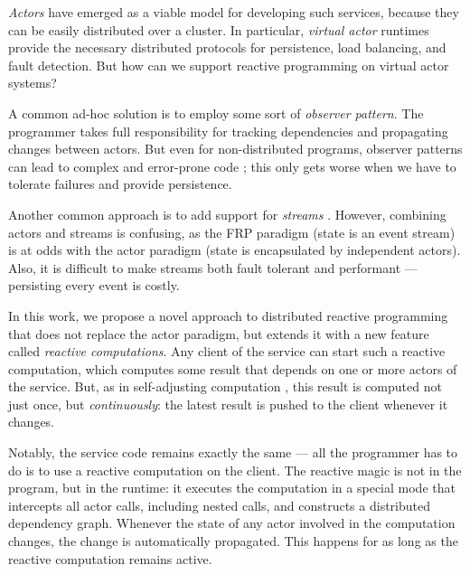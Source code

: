 \emph{Actors} have emerged as a viable model for developing such services, because they can be easily distributed over a cluster. In particular, \emph{virtual actor} runtimes provide the necessary distributed protocols for persistence, load balancing, and fault detection. But how can we support reactive programming on virtual actor systems?
 
A common ad-hoc solution is to employ some sort of \emph{observer pattern}. The programmer takes full responsibility for tracking dependencies and propagating changes between actors. But even for non-distributed programs, observer patterns can lead to complex and error-prone code \cite{}; this only gets worse when we have to tolerate failures and provide persistence. 

Another common approach is to add support for \emph{streams} \cite{}. However, combining actors and streams is confusing, as the FRP paradigm (state is an event stream) is at odds with the actor paradigm (state is encapsulated by independent actors). Also, it is difficult to make streams both fault tolerant and performant ---  persisting every event is costly. 

 In this work, we propose a novel approach to distributed reactive programming that does not replace the actor paradigm, but extends it with a new feature called \emph{reactive computations}. Any client of the service can start such a reactive computation, which computes some result that depends on one or more actors of the service. But, as in self-adjusting computation \cite{}, this result is computed not just once, but \emph{continuously}: the latest result is pushed to the client whenever it changes. 

Notably, the service code remains exactly the same ---  all the programmer has to do is to use a reactive computation on the client.  The reactive magic is not in the program, but in the runtime: it executes the computation in a special mode that intercepts all actor calls, including nested calls, and constructs a distributed dependency graph. Whenever the state of any actor involved in the computation changes, the change is automatically  propagated. This happens for as long as the reactive computation remains active. 


